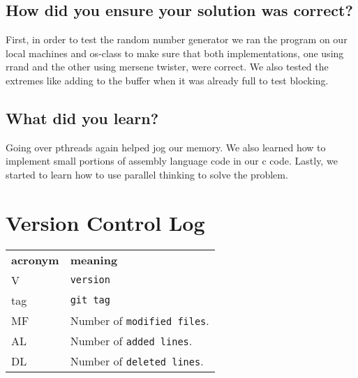 \documentclass[letterpaper,10pt,titlepage, onecolumn, compsoc]{IEEEtran}
\begin{document}
\subsection{How did you ensure your solution was correct?}
First, in order to test the random number generator we ran the program on our local machines and os-class to make sure that both implementations, one using rrand and the other using mersene twister, were correct. We also tested the extremes like adding to the buffer when  it was already full to test blocking. 

\subsection{What did you learn?}
Going over pthreads again helped jog our memory. We also learned how to implement small portions of assembly language code in our c code. Lastly, we started to learn how to use parallel thinking to solve the problem. 


\section{Version Control Log}
\begin{tabular}{lp{12cm}}
  \label{tabular:legend:git-log}
  \textbf{acronym} & \textbf{meaning} \\
  V & \texttt{version} \\
  tag & \texttt{git tag} \\
  MF & Number of \texttt{modified files}. \\
  AL & Number of \texttt{added lines}. \\
  DL & Number of \texttt{deleted lines}. \\
\end{tabular}

\bigskip
\end{document}
